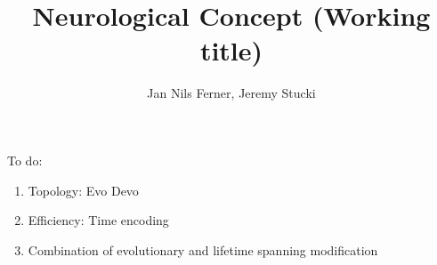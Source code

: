 \documentclass[a4paper]{article}
\title{Neurological Concept (Working title)}
\author{Jan Nils Ferner, Jeremy Stucki}
\begin{document}
\maketitle
\thispagestyle{empty}

\clearpage

\twocolumn

\begin{abstract}
	
\end{abstract}

\clearpage

\onecolumn
\tableofcontents
\twocolumn

\clearpage

To do:
\begin{enumerate}
	\item Topology: Evo Devo
	\item Efficiency: Time encoding
	\item Combination of evolutionary and lifetime spanning modification
\end{enumerate}






\clearpage

\nocite{*}


\end{document}
